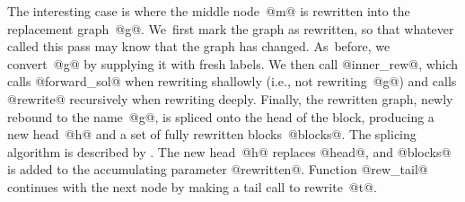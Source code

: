\documentclass[blockstyle,preprint,nocopyrightspace]{sigplanconf}
\newcommand{\authornote}[1]{{\em #1}}
\def\authornote#1{\unskip\relax}
\newcommand{\norman}[1]{\authornote{NR: #1}}
\let\remark\norman
\begin{document}
The interesting case is where the middle node~@m@ is rewritten into
the replacement graph~@g@. \remark{line number}
We~first mark the graph as rewritten, so that whatever called this
pass may know that the graph has changed.
As~before, we convert~@g@ by supplying it with fresh labels.
We then call @inner_rew@, which calls @forward_sol@ when rewriting
shallowly (i.e., not rewriting~@g@) and calls @rewrite@ recursively
when rewriting deeply.
Finally, the rewritten graph, newly rebound to the name~@g@, is
spliced onto the head of the block, producing a new head~@h@ and a set
of fully rewritten blocks~@blocks@.
The splicing algorithm is described by
\citet{ramsey-dias:applicative-control-flow}. 
The new head~@h@ replaces @head@, and @blocks@ is added to the
accumulating parameter @rewritten@.
Function @rew_tail@ continues with the next node by making a tail call
to rewrite~@t@.
\end{document}
